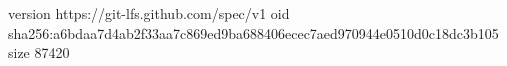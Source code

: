 version https://git-lfs.github.com/spec/v1
oid sha256:a6bdaa7d4ab2f33aa7c869ed9ba688406ecec7aed970944e0510d0c18dc3b105
size 87420
